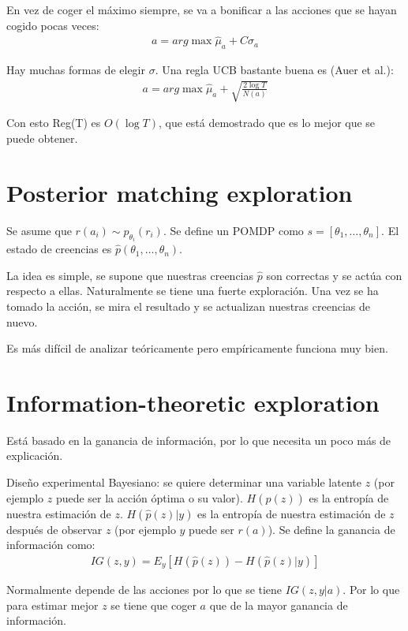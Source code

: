En vez de coger el máximo siempre, se va a bonificar a las acciones que se hayan cogido pocas
veces:
\begin{align}
    a=arg\max \hat{\mu}_a+C\sigma_a
\end{align}

Hay muchas formas de elegir $\sigma$. Una regla UCB bastante buena es (Auer et al.):
\begin{align}
    a=arg\max \hat{\mu}_a + \sqrt{ \frac{2\log T}{N(a)}  }
\end{align}

Con esto Reg(T) es $O(\log T)$, que está demostrado que es lo mejor que se puede obtener.

\section{Posterior matching exploration}%
\label{sec:posterior_matching_exploration}

Se asume que $r(a_i)\sim p_{\theta_i}(r_i)$. Se define un POMDP como
$s=[\theta_1,\ldots,\theta_n]$. El estado de creencias es $\hat{p}(\theta_1,\ldots,\theta_n)$.

La idea es simple, se supone que nuestras creencias $\hat{p}$ son correctas y se actúa con
respecto a ellas. Naturalmente se tiene una fuerte exploración. Una vez se ha tomado la acción,
se mira el resultado y se actualizan nuestras creencias de nuevo.

Es más difícil de analizar teóricamente pero empíricamente funciona muy bien.

\section{Information-theoretic exploration}%
\label{sec:information_theoretic_exploration}

Está basado en la ganancia de información, por lo que necesita un poco más de explicación.

Diseño experimental Bayesiano: se quiere determinar una variable latente $z$ (por ejemplo $z$
puede ser la acción óptima o su valor).  $H(\hat{p}(z))$ es la entropía de nuestra estimación
de $z$. $H(\hat{p}(z)|y)$ es la entropía de nuestra estimación de $z$ después de observar
$z$ (por ejemplo $y$ puede ser $r(a)$). Se define la ganancia de información como:
\begin{align}
    IG(z,y)=E_y[H(\hat{p}(z))-H(\hat{p}(z)|y)]
\end{align}

Normalmente depende de las acciones por lo que se tiene $IG(z,y|a)$. Por lo que para estimar
mejor  $z$ se tiene que coger $a$ que de la mayor ganancia de información.

